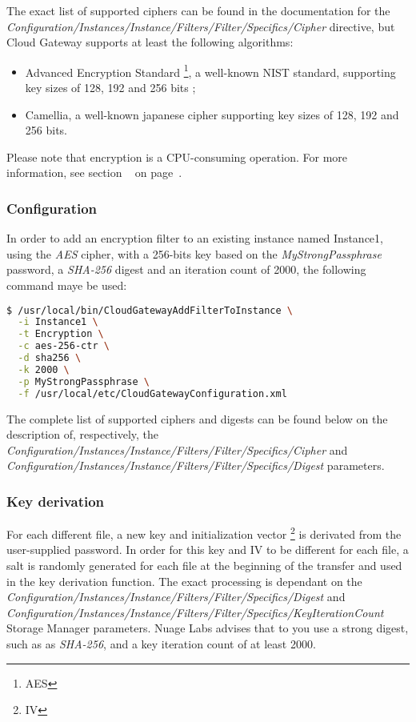\documentclass[11pt,fleqn,openany]{book} %
\begin{document}
The exact list of supported ciphers can be found in the documentation for the \textit{Configuration/Instances/Instance/Filters/Filter/Specifics/Cipher} directive,
but Cloud Gateway supports at least the following algorithms:\\
\begin{itemize}
\item Advanced Encryption Standard \footnote{AES}, a well-known NIST standard, supporting key sizes of 128, 192 and 256 bits ;
\item Camellia, a well-known japanese cipher supporting key sizes of 128, 192 and 256 bits.\\
\end{itemize}

Please note that encryption is a CPU-consuming operation. For more information, see section ~ on page~\pageref{sec:performance-encryption}.

\subsubsection{Configuration}

In order to add an encryption filter to an existing instance named Instance1, using the \textit{AES} cipher, with a 256-bits key based on the \textit{MyStrongPassphrase} password,
a \textit{SHA-256} digest and an iteration count of 2000, the following command maye be used:

\begin{lstlisting}[language=bash]
$ /usr/local/bin/CloudGatewayAddFilterToInstance \
  -i Instance1 \
  -t Encryption \
  -c aes-256-ctr \
  -d sha256 \
  -k 2000 \
  -p MyStrongPassphrase \
  -f /usr/local/etc/CloudGatewayConfiguration.xml
\end{lstlisting}

The complete list of supported ciphers and digests can be found below on the description of, respectively,
the \textit{Configuration/Instances/Instance/Filters/Filter/Specifics/Cipher} and
\textit{Configuration/Instances/Instance/Filters/Filter/Specifics/Digest} parameters.

\subsubsection{Key derivation}

For each different file, a new key and initialization vector \footnote{IV} is derivated from the user-supplied password. In order
for this key and IV to be different for each file, a salt is randomly generated for each file at the beginning of the transfer and
used in the key derivation function. The exact processing is dependant on the \textit{Configuration/Instances/Instance/Filters/Filter/Specifics/Digest}
and \textit{Configuration/Instances/Instance/Filters/Filter/Specifics/KeyIterationCount} Storage Manager parameters.
Nuage Labs advises that to you use a strong digest, such as as \textit{SHA-256}, and a key iteration count of at least 2000.
\end{document}
